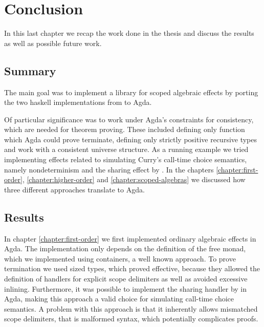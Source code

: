 \documentclass[10pt,a4paper,twoside,notitlepage]{report}
\begin{document}
\chapter{Conclusion}
\label{chapter:conclusion}

In this last chapter we recap the work done in the thesis and discuss the
results as well as possible future work.

\section{Summary}

The main goal was to implement a library for scoped algebraic effects by
porting the two haskell implementations from
 to Agda.

Of particular significance was to work under Agda's constraints for consistency,
which are needed for theorem proving.
These included defining only function which Agda could prove terminate, defining
only strictly positive recursive types and work with a consistent universe
structure.
As a running example we tried implementing effects related to simulating Curry's
call-time choice semantics, namely nondeterminism and the sharing effect by
\textcite{bunkenburg2019modeling}.
In the chapters \ref{chapter:first-order}, \ref{chapter:higher-order} and
\ref{chapter:scoped-algebras} we discussed how three different approaches
translate to Agda.


\section{Results}

In chapter \ref{chapter:first-order} we first implemented ordinary algebraic
effects in Agda.
The implementation only depends on the definition of the free monad, which
we implemented using containers, a well known approach.
To prove termination we used sized types, which proved effective, because they
allowed the definition of \textcite{DBLP:conf/haskell/WuSH14} handlers for
explicit scope delimiters as well as avoided excessive inlining.
Furthermore, it was possible to implement the sharing handler by
\textcite{bunkenburg2019modeling} in Agda, making this approach a valid choice
for simulating call-time choice semantics.
A problem with this approach is that it inherently allows mismatched scope
delimiters, that is malformed syntax, which potentially complicates proofs.
\end{document}
